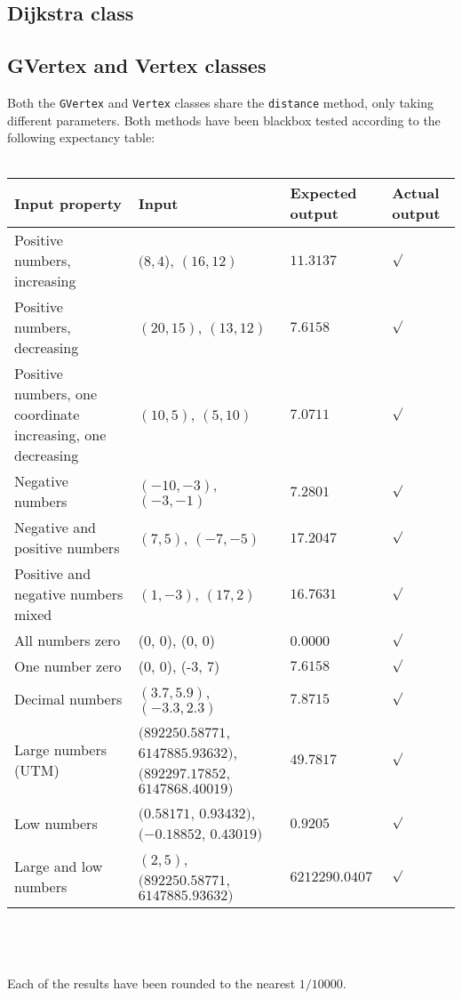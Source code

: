\documentclass[a4paper,11pt]{article}
\begin{document}
\pagebreak
\subsection{Dijkstra class}


\pagebreak
\subsection{GVertex and Vertex classes}
Both the \texttt{GVertex} and \texttt{Vertex} classes share the \texttt{distance} method, only taking different parameters. Both methods have been blackbox tested according to the following expectancy table: \\ \\
\begin{tabular}{ p{3.5cm} | p{4cm} | p{2.5cm} | p{1cm} }
	Input property & Input & Expected output & Actual output \\
	\hline
	Positive numbers, increasing & $(8,4$), $(16,12)$ & $11.3137$ & $\surd$ \\
	Positive numbers, decreasing & $(20,15)$, $(13,12)$ & $7.6158$ & $\surd$ \\
	Positive numbers, one coordinate increasing, one decreasing & $(10, 5)$, $(5, 10)$ & $7.0711$ & $\surd$ \\
	Negative numbers & $(-10, -3)$, $(-3, -1)$ & $7.2801$ & $\surd$ \\
	Negative and positive numbers & $(7, 5)$, $(-7, -5)$ & $17.2047$ & $\surd$ \\
	Positive and negative numbers mixed & $(1, -3)$, $(17, 2)$ & $16.7631$ & $\surd$ \\
	All numbers zero & (0, 0), (0, 0) & 0.0000 & $\surd$ \\
	One number zero & (0, 0), (-3, 7) & $7.6158$ & $\surd$ \\
	Decimal numbers & $(3.7, 5.9)$, $(-3.3, 2.3)$ & $7.8715$ & $\surd$ \\
	Large numbers (UTM) & $(892250.58771$, $6147885.93632)$, $(892297.17852$, $6147868.40019)$ & $49.7817$ & $\surd$ \\
	Low numbers & $(0.58171$, $0.93432)$, $(-0.18852$, $0.43019)$ & $0.9205$ & $\surd$ \\
	Large and low numbers & $(2, 5)$, $(892250.58771$, $6147885.93632)$ & $6212290.0407$ & $\surd$
\end{tabular}
\\ \\ \\
Each of the results have been rounded to the nearest $1/10000$.
\end{document}
